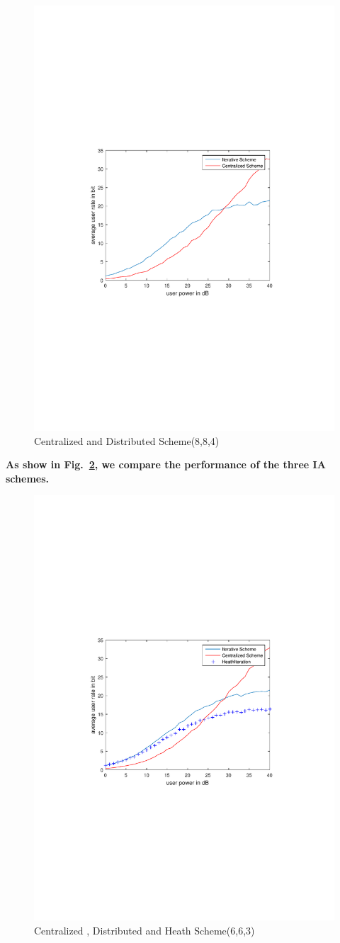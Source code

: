 \documentclass[12pt, onecolumn]{IEEEtran}
\begin{document}
\begin{figure}[H]
    \centering\includegraphics[width=0.65\columnwidth]{result_88.pdf}
    \caption{ Centralized and Distributed Scheme(8,8,4)}\label{FIG:result_88}
\end{figure}


\textbf{As show in Fig.~\ref{FIG:resultWithHeath66.pdf}, we compare the performance of the three IA schemes. }
\begin{figure}[H]
    \centering\includegraphics[width=0.65\columnwidth]{resultWithHeath66.pdf}
    \caption{ Centralized , Distributed and Heath Scheme(6,6,3)}\label{FIG:resultWithHeath66.pdf}
\end{figure}



%


\end{document}
